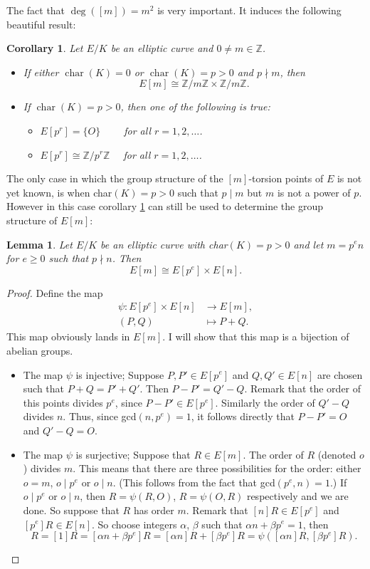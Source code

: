 \documentclass{article}
\numberwithin{equation}{section}
\newtheorem{lemma}[theorem]{Lemma}
\newtheorem{corollary}[theorem]{Corollary}
\theoremstyle{definition}
\newcommand{\ZZ}{{\mathbb Z}} %
\newcommand{\Zmod}[1]{\ZZ / #1\ZZ} %
\newcommand{\Char}[1]{\operatorname{char} (#1)} %
\newcommand{\degree}[1]{\operatorname{deg} \left(#1\right)} %
\begin{document}
The fact that $\degree{[m]}=m^2$ is very important. It induces the following beautiful result:

\begin{corollary}\label{torgrpstructure}
Let $E/K$ be an elliptic curve and $0 \neq m \in \ZZ$.
\begin{itemize}
\item If either $\Char{K}=0$ or $\Char{K}=p>0$ and $p \nmid m$, then $$E[m]\cong\Zmod{m}\times \Zmod{m}.$$
\item If $\Char{K}=p>0$, then one of the following is true:
\begin{itemize}
\item $E[p^r]=\{O\} \quad \quad$ for all $r=1,2,\ldots$.
\item $E[p^r]\cong\Zmod{p^r} \quad$ for all $r=1,2,\ldots$.
\end{itemize}
\end{itemize}
\end{corollary}

The only case in which the group structure of the $[m]$-torsion points of $E$ is not yet known, is when char$(K)=p>0$ such that $p \mid m$ but $m$ is not a power of $p$. However in this case corollary \ref{torgrpstructure} can still be used to determine the group structure of $E[m]$:

\begin{lemma} \label{torgrpremark}
Let $E/K$ be an elliptic curve with char$(K)=p>0$ and let $m=p^en$ for $e \geq 0$ such that $p \nmid n$. Then $$E[m] \cong E[p^e] \times E[n].$$
\end{lemma}

\begin{proof}
Define the map \begin{align*} \psi: E[p^e] \times E[n] &\rightarrow E[m],\\ (P,Q) & \mapsto P+Q. \end{align*} This map obviously lands in $E[m]$. I will show that this map is a bijection of abelian groups. 
\begin{itemize}
\item The map $\psi$ is injective; Suppose $P,P' \in E[p^e]$ and $Q,Q' \in E[n]$ are chosen such that $P+Q=P'+Q'$. Then $P-P'=Q'-Q$.  Remark that the order of this points divides $p^e$, since $P-P'\in E[p^e]$. Similarly the order of $Q'-Q$ divides $n$. Thus, since gcd$(n,p^e)=1$, it follows directly that $P-P'=O$ and $Q'-Q=O$.
\item The map $\psi$ is surjective; Suppose that $R \in E[m]$. The order of $R$ (denoted $o$) divides $m$. This means that there are three possibilities for the order: either $o=m$, $o\mid p^e$ or $o \mid n$. (This follows from the fact that gcd$(p^e,n)=1$.) If $o\mid p^e$ or $o \mid n$, then $R = \psi(R,O)$, $R=\psi(O,R)$ respectively and we are done. So suppose that $R$ has order $m$. Remark that $[n]R \in E[p^e]$ and $[p^e]R \in E[n]$. So choose integers $\alpha$, $\beta$ such that $\alpha n + \beta p^e = 1$, then $$R=[1]R=[\alpha n + \beta p^e] R = [\alpha n] R + [\beta p^e] R = \psi([\alpha n]R,[\beta p^e]R).$$ 
\end{itemize}
\end{proof}
\end{document}
